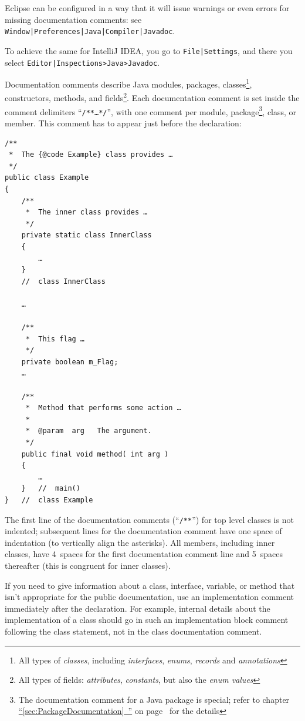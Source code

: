 \documentclass[11pt,a4paper, titlepage, parskip=half, headsepline, footsepline, cleardoublepage=current, headheight=1cm]{scrbook}
\newcommand*{\tqfullvref}[1]{\hyperref[{#1}]{“\ref*{#1}~\nameref*{#1}”} on page~\pageref{#1}}
\begin{document}
Eclipse can be configured in a way that it will issue warnings or even errors for missing documentation comments: see \verb#Window|Preferences|Java|Compiler|Javadoc#.

To achieve the same for IntelliJ IDEA, you go to \verb#File|Settings#, and there you select \verb#Editor|Inspections>Java>Javadoc#.

Documentation comments describe Java modules, packages, classes\footnote{All types of \textit{classes}, including \textit{interfaces}, \textit{enums}, \textit{records} and \textit{annotations}}, constructors, methods, and fields\footnote{All types of fields: \textit{attributes}, \textit{constants}, but also the \textit{enum values}}. Each documentation comment is set inside the comment delimiters “\verb#/**…*/#”, with one comment per module, package\footnote{The documentation comment for a Java package is special; refer to chapter \tqfullvref{sec:PackageDocumentation} for the details}, class, or member. This comment has to appear just before the declaration:

\begin{lstlisting}
/**
 *  The {@code Example} class provides …
 */
public class Example
{
    /**
     *  The inner class provides …
     */
    private static class InnerClass
    {
        …
    }
    //  class InnerClass
     
    …
    
    /**
     *  This flag …
     */
    private boolean m_Flag;
    …

    /**
     *  Method that performs some action …
     *
     *  @param  arg   The argument.
     */
    public final void method( int arg )
    {
        …
    }   //  main()
}   //  class Example
\end{lstlisting}

The first line of the documentation comments (“\verb#/**#”) for top level classes is not indented; subsequent lines for the documentation comment have one space of indentation (to vertically align the asterisks). All members, including inner classes, have 4~spaces for the first documentation comment line and 5~spaces thereafter (this is congruent for inner classes).

If you need to give information about a class, interface, variable, or method that isn't appropriate for the public documentation, use an implementation comment immediately after the declaration. For example, internal details about the implementation of a class should go in such an implementation block comment following the class statement, not in the class documentation comment.
\end{document}
